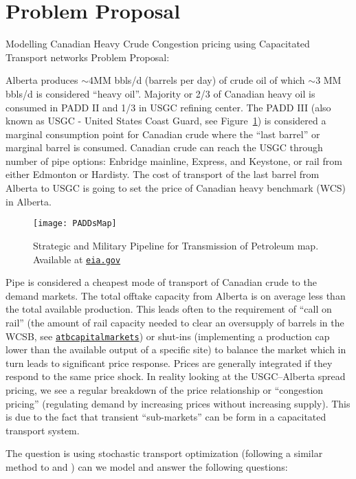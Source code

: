 \documentclass[11pt, letterpaper,nounbold]{article}
\begin{document}
\section{Problem Proposal}
Modelling Canadian Heavy Crude Congestion pricing using Capacitated Transport networks 
Problem Proposal:

Alberta produces $\sim$4MM bbls/d (barrels per day) of crude oil of which $\sim$3 MM bbls/d is considered ``heavy oil''. Majority or 2/3 of Canadian heavy oil is consumed in PADD II and 1/3 in USGC refining center. The PADD III (also known as USGC - United States Coast Guard, see Figure~\ref{PADDsMap})  is considered a marginal consumption point for Canadian crude where the “last barrel” or marginal barrel is consumed. Canadian crude can reach the USGC through number of pipe options: Enbridge mainline, Express, and Keystone, or rail from either Edmonton or Hardisty. The cost of transport of the last barrel from Alberta to USGC is going to set the price of Canadian heavy benchmark (WCS) in Alberta. 

\begin{figure}[h!]
\centering
\texttt{[image: PADDsMap]}
\caption{Strategic and Military Pipeline for Transmission of Petroleum map. Available at \href{https://www.eia.gov/todayinenergy/detail.php?id=4890}{\nolinkurl{eia.gov}}} \label{PADDsMap}
\end{figure}


Pipe is considered a cheapest mode of transport of Canadian crude to the demand markets. The total offtake capacity from Alberta is on average less than the total available production. This leads often to the requirement of “call on rail” (the amount of rail capacity needed to clear an oversupply of barrels in the WCSB, see \href{https://atbcapitalmarkets.com/insights/north-american-crude-by-rail}{\nolinkurl{atbcapitalmarkets}}) or shut-ins (implementing a production cap lower than the available output of a specific site) to balance the market which in turn leads to significant price response. 
Prices are generally integrated if they respond to the same price shock. In reality looking at the USGC--Alberta spread pricing, we see a regular breakdown of the price relationship or ``congestion pricing'' (regulating demand by increasing prices without increasing supply). This is due to the fact that transient ``sub-markets'' can be form in a capacitated transport system.   


The question is using stochastic transport optimization (following a similar method to \cite{Pavlin2019} and \cite{Zhu2018}) can we model and answer the following questions:
\end{document}
